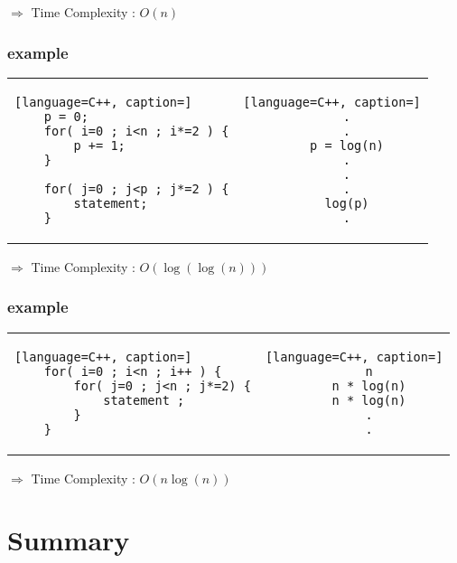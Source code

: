 \documentclass[12pt]{article}
\begin{document}
$\Rightarrow$ Time Complexity : $O(n)$







\subsubsection{example}


\begin{center}
  \bgroup
  \def\arraystretch{1.5}%
  \begin{tabular}{ H  C  }
	\begin{lstlisting}[language=C++, caption=]
	p = 0;
	for( i=0 ; i<n ; i*=2 ) {
		p += 1;
	}
	
	for( j=0 ; j<p ; j*=2 ) {
		statement;
	}
	\end{lstlisting}
     &  
	\begin{lstlisting}[language=C++, caption=]
	.
	.
	p = log(n)
	.
	.
	.
	log(p)
	.
	\end{lstlisting}
  \end{tabular}
  \egroup
\end{center}


$\Rightarrow$ Time Complexity : $O(\log{(\log{(n)})})$



\subsubsection{example}


\begin{center}
  \bgroup
  \def\arraystretch{1.5}%
  \begin{tabular}{ E  C  }
	\begin{lstlisting}[language=C++, caption=]
	for( i=0 ; i<n ; i++ ) {
		for( j=0 ; j<n ; j*=2) {
			statement ;
		}
	}
	\end{lstlisting}
     &  
	\begin{lstlisting}[language=C++, caption=]
	n
	n * log(n)
	n * log(n)
	.
	.
	\end{lstlisting}
  \end{tabular}
  \egroup
\end{center}



$\Rightarrow$ Time Complexity : $O(n \log{(n)})$





\section{Summary}
\end{document}
